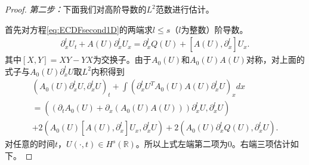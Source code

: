 \begin{proof}
\emph{第二步：}下面我们对高阶导数的$L^2$范数进行估计。

首先对方程\eqref{eq:ECDFsecond1D}的两端求$l\le s$（$l$为整数）阶导数。 
\begin{eqnarray*}
\partial^l_x U_t + A(U) \partial^l_x U_x = \partial^l_x Q(U) + [A(U),\partial^l_x]U_x.
\end{eqnarray*}
其中$[X,Y]=XY-YX$为交换子。由于$A_0(U)$和$A_0(U)A(U)$对称，对上面的式子与$A_0(U)\partial^l_x U$取$L^2$内积得到
\begin{multline}\label{45}
  (A_0(U)\partial^l_x U,\partial^l_x U)_t + \int (\partial^l_x U^T A_0(U)A(U)\partial^l_x U)_x dx \\
  = ((\partial_t A_0(U)+\partial_x(A_0(U)A(U)))\partial^l_x U,\partial^l_x U) \\
  + 2(A_0(U)[A(U),\partial^l_x]U_x,\partial^l_x U) + 2(A_0(U) \partial^l_x Q(U), \partial^l_x U).
\end{multline}
对任意的时间$t$，$U(\cdot, t)\in H^s(\mathbb{R})$。所以上式左端第二项为0。右端三项估计如下。


\end{proof}
